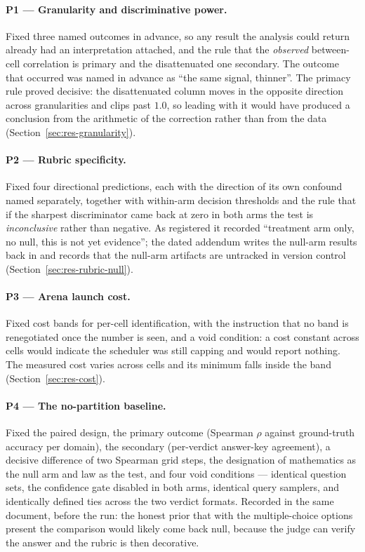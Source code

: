 \paragraph{P1 --- Granularity and discriminative power.} Fixed three named
outcomes in advance, so any result the analysis could return already had an
interpretation attached, and the rule that the \emph{observed} between-cell
correlation is primary and the disattenuated one secondary. The outcome that
occurred was named in advance as ``the same signal, thinner''. The primacy rule
proved decisive: the disattenuated column moves in the opposite direction
across granularities and clips past $1.0$, so leading with it would have
produced a conclusion from the arithmetic of the correction rather than from
the data (Section~\ref{sec:res-granularity}).

\paragraph{P2 --- Rubric specificity.} Fixed four directional predictions, each
with the direction of its own confound named separately, together with
within-arm decision thresholds and the rule that if the sharpest discriminator
came back at zero in both arms the test is \emph{inconclusive} rather than
negative. As registered it recorded ``treatment arm only, no null, this is not
yet evidence''; the dated addendum writes the null-arm results back in and
records that the null-arm artifacts are untracked in version control
(Section~\ref{sec:res-rubric-null}).

\paragraph{P3 --- Arena launch cost.} Fixed cost bands for per-cell
identification, with the instruction that no band is renegotiated once the
number is seen, and a void condition: a cost constant across cells would
indicate the scheduler was still capping and would report nothing. The measured
cost varies across cells and its minimum falls inside the band
(Section~\ref{sec:res-cost}).

\paragraph{P4 --- The no-partition baseline.} Fixed the paired design, the
primary outcome (Spearman $\rho$ against ground-truth accuracy per domain), the
secondary (per-verdict answer-key agreement), a decisive difference of two
Spearman grid steps, the designation of mathematics as the null arm and law as
the test, and four void conditions --- identical question sets, the confidence
gate disabled in both arms, identical query samplers, and identically defined
ties across the two verdict formats. Recorded in the same document, before the
run: the honest prior that with the multiple-choice options present the
comparison would likely come back null, because the judge can verify the answer
and the rubric is then decorative.

